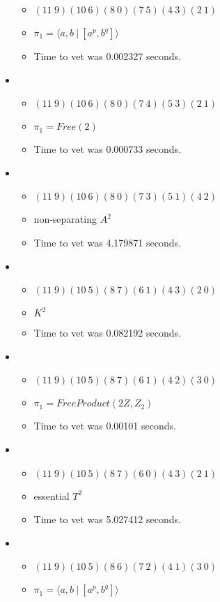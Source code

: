 \documentclass{article}
\begin{document}
\begin{itemize}
\begin{itemize}
      \item $(11\ 9)(10\ 6)(8\ 0)(7\ 5)(4\ 3)(2\ 1)$
      \item $\pi_1 = \langle a,b\ |\ [a^p,b^q]\rangle$
      \item Time to vet was 0.002327 seconds.
\end{itemize}
\item \begin{itemize}
      \item $(11\ 9)(10\ 6)(8\ 0)(7\ 4)(5\ 3)(2\ 1)$
      \item $\pi_1 =Free(2)$
      \item Time to vet was 0.000733 seconds.
\end{itemize}
\item \begin{itemize}
      \item $(11\ 9)(10\ 6)(8\ 0)(7\ 3)(5\ 1)(4\ 2)$
      \item non-separating $A^2$
      \item Time to vet was 4.179871 seconds.
\end{itemize}
\item \begin{itemize}
      \item $(11\ 9)(10\ 5)(8\ 7)(6\ 1)(4\ 3)(2\ 0)$
      \item $K^2$
      \item Time to vet was 0.082192 seconds.
\end{itemize}
\item \begin{itemize}
      \item $(11\ 9)(10\ 5)(8\ 7)(6\ 1)(4\ 2)(3\ 0)$
      \item $\pi_1 =FreeProduct( 2 Z, Z_2 )$
      \item Time to vet was 0.00101 seconds.
\end{itemize}
\item \begin{itemize}
      \item $(11\ 9)(10\ 5)(8\ 7)(6\ 0)(4\ 3)(2\ 1)$
      \item essential $T^2$
      \item Time to vet was 5.027412 seconds.
\end{itemize}
\item \begin{itemize}
      \item $(11\ 9)(10\ 5)(8\ 6)(7\ 2)(4\ 1)(3\ 0)$
      \item $\pi_1 = \langle a,b\ |\ [a^p,b^q]\rangle$

\end{itemize}
\end{itemize}
\end{document}
